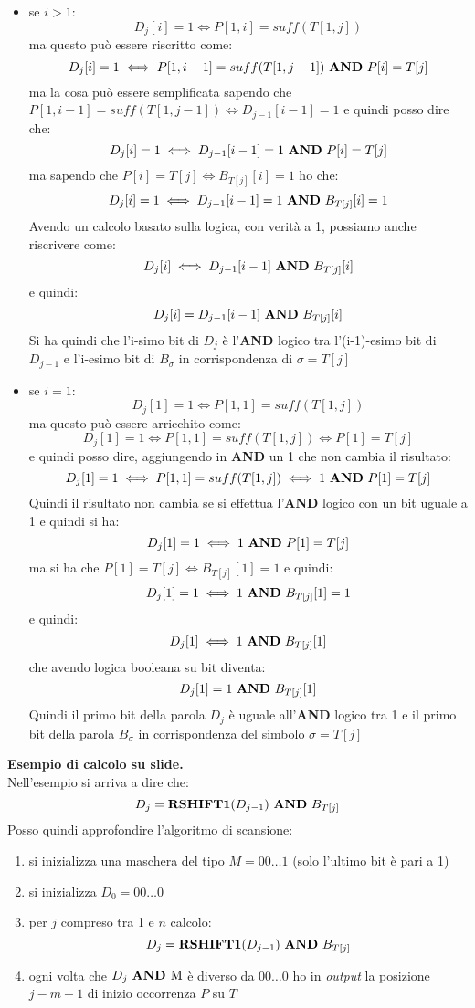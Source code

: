 \begin{itemize}
  \item se $i>1$:
  \[D_j[i]=1\iff P[1,i]=suff(T[1,j])\]
  ma questo può essere riscritto come:
  \[D_j[i]=1\iff P[1,i-1]=suff(T[1,j-1])\mbox{ \textbf{AND} }P[i]=T[j]\]
  ma la cosa può essere semplificata sapendo che $P[1,i-1]=suff(T[1,j-1])\iff
  D_{j-1}[i-1]=1$ e quindi posso dire che:
  \[D_j[i]=1\iff  D_{j-1}[i-1]=1\mbox{ \textbf{AND} }P[i]=T[j]\]
  ma sapendo che $P[i]=T[j]\iff B_{T[j]}[i]=1$ ho che:
  \[D_j[i]=1\iff  D_{j-1}[i-1]=1\mbox{ \textbf{AND} }B_{T[j]}[i]=1\]
  Avendo un calcolo basato sulla logica, con verità a 1, possiamo anche
  riscrivere come:
  \[D_j[i]\iff  D_{j-1}[i-1]\mbox{ \textbf{AND} }B_{T[j]}[i]\]
  e quindi:
  \[D_j[i]=  D_{j-1}[i-1]\mbox{ \textbf{AND} }B_{T[j]}[i]\]
  Si ha quindi che l'i-simo bit di $D_j$ è l'\textbf{AND} logico tra
  l'(i-1)-esimo bit di $D_{j-1}$ e l'i-esimo bit di $B_\sigma$ in corrispondenza
  di $\sigma=T[j]$
  
  \item se $i=1$:
  \[D_j[1]=1\iff P[1,1]=suff(T[1,j])\]
  ma questo può essere arricchito come:
  \[D_j[1]=1\iff P[1,1]= suff(T[1,j])\iff P[1]=T[j]\]
  e quindi posso dire, aggiungendo in \textbf{AND} un 1 che non cambia il
  risultato: 
  \[D_j[1]=1\iff P[1,1]= suff(T[1,j])\iff 1\mbox{ \textbf{AND} }P[1]=T[j]\]
  Quindi il risultato non cambia se si effettua l'\textbf{AND} logico con un bit
  uguale a 1 e quindi si ha:
  \[D_j[1]=1\iff 1\mbox{ \textbf{AND} }P[1]=T[j]\]
  ma si ha che $P[1]=T[j]\iff B_{T[j]}[1]=1$ e quindi:
  \[D_j[1]=1\iff 1\mbox{ \textbf{AND} }B_{T[j]}[1]=1\]
  e quindi:
  \[D_j[1]\iff 1\mbox{ \textbf{AND} }B_{T[j]}[1]\]
  che avendo logica booleana su bit diventa:
  \[D_j[1]= 1\mbox{ \textbf{AND} }B_{T[j]}[1]\]
  Quindi il primo bit della parola $D_j$ è uguale all'\textbf{AND} logico tra 1
  e il primo bit della parola $B_\sigma$ in corrispondenza del simbolo
  $\sigma=T[j]$  
\end{itemize}
\textbf{Esempio di calcolo su slide.}\\
Nell'esempio si arriva a dire che:
\[D_j=\mathbf{RSHIFT1}(D_{j-1})\mbox{ \textbf{AND} }B_{T[j]}\]
Posso quindi approfondire l'algoritmo di scansione:
\begin{enumerate}
  \item si inizializza una maschera del tipo $M=00\ldots 1$ (solo l'ultimo bit è
  pari a 1)
  \item si inizializza $D_0=00\ldots 0$
  \item per $j$ compreso tra 1 e $n$ calcolo:
  \[D_j=\mathbf{RSHIFT1}(D_{j-1})\mbox{ \textbf{AND} }B_{T[j]}\]
  \item ogni volta che $D_j\mbox{ \textbf{AND }M}$ è diverso da $00\ldots0$ ho
  in \textit{output} la posizione $j-m+1$ di inizio occorrenza $P$ su $T$
\end{enumerate}
